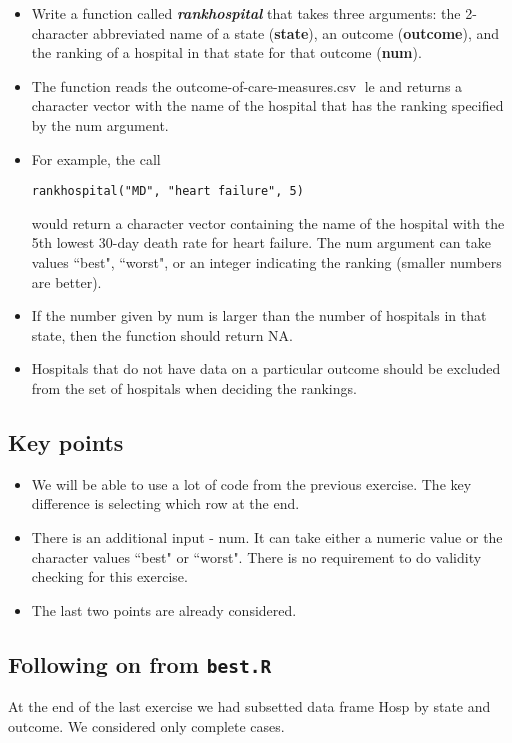 \documentclass[]{article}
\begin{document}
\begin{itemize}
\item Write a function called \textit{\textbf{rankhospital}} that takes three arguments: the 2-character abbreviated name of a
state (\textbf{state}), an outcome (\textbf{outcome}), and the ranking of a hospital in that state for that outcome (\textbf{num}).
\item The function reads the outcome-of-care-measures.csv le and returns a character vector with the name
of the hospital that has the ranking specified by the num argument. 
\item For example, the call
\begin{verbatim}
rankhospital("MD", "heart failure", 5)
\end{verbatim}
would return a character vector containing the name of the hospital with the 5th lowest 30-day death rate
for heart failure. The num argument can take values ``best", ``worst", or an integer indicating the ranking
(smaller numbers are better). \item If the number given by num is larger than the number of hospitals in that
state, then the function should return NA. \item Hospitals that do not have data on a particular outcome should
be excluded from the set of hospitals when deciding the rankings.
\end{itemize}
\newpage
\subsection{Key points}
\begin{itemize}
\item We will be able to use a lot of code from the previous exercise. The key difference is selecting which row at the end.
\item There is an additional input - num. It can take either a numeric value or the character values ``best" or ``worst". There is no requirement to do validity checking for this exercise.

\item The last two points are already considered.
\end{itemize}

\subsection{Following on from \texttt{best.R}}

At the end of the last exercise we had subsetted data frame Hosp by state and outcome. We considered only complete cases.
\end{document}
